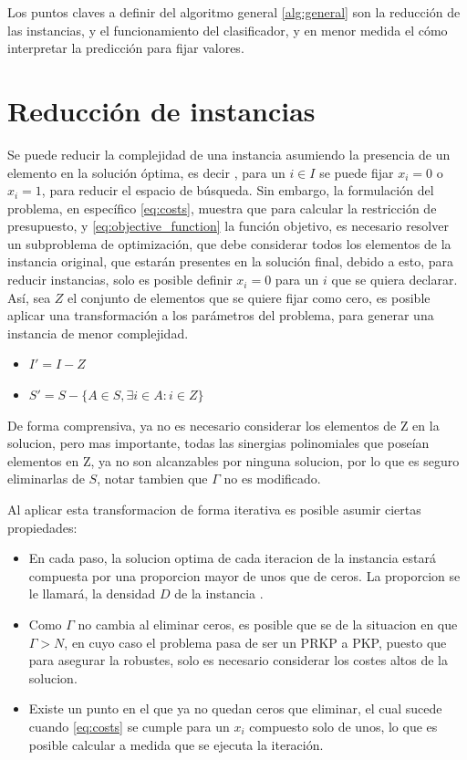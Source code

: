 \documentclass[spanish, a4paper, 12pt, twoside, openany,final]{book}
\numberwithin{equation}{section}
\begin{document}
Los puntos claves a definir del algoritmo general \ref{alg:general} son la reducción de las instancias, y el funcionamiento del clasificador, y en menor medida el cómo interpretar la predicción para fijar valores.





\section{Reducción de instancias}

Se puede reducir la complejidad de una instancia asumiendo la presencia de un elemento en la solución óptima, es decir , para un $i \in I$ se puede fijar $x_i=0$ o $x_i = 1$, para reducir el espacio de búsqueda. Sin embargo, la formulación del problema, en específico \ref{eq:costs}, muestra que para calcular la restricción de presupuesto, y \ref{eq:objective_function} la función objetivo, es necesario resolver un subproblema de optimización, que debe considerar todos los elementos de la instancia original, que estarán presentes en la solución final, debido a esto, para reducir instancias, solo es posible definir $x_i=0$ para un $i$ que se quiera declarar. Así, sea $Z$ el conjunto de elementos que se quiere fijar como cero, es posible aplicar una transformación a los parámetros del problema, para generar una instancia de menor complejidad.
	
\begin{itemize}
	\item $I' = I - Z$
	\item $S' = S - \{A \in S, \exists i \in A: i \in Z\} $
\end{itemize}

De forma comprensiva, ya no es necesario considerar los elementos de Z en la solucion, pero mas importante,
todas las sinergias polinomiales que poseían elementos en Z, ya no son alcanzables por ninguna solucion, por lo que es seguro eliminarlas de $S$, notar tambien que $\Gamma$ no es modificado.

Al aplicar esta transformacion de forma iterativa es posible asumir ciertas propiedades:


\begin{itemize}
\item En cada paso, la solucion optima de cada iteracion de la instancia estará compuesta por una proporcion mayor de unos que de ceros. La proporcion se le llamará, la densidad $D$ de la instancia .

\item  Como $\Gamma$ no cambia al eliminar ceros, es posible que se de la situacion en que $\Gamma > N$, en cuyo caso el problema pasa de ser un PRKP a PKP, puesto que para asegurar la robustes, solo es necesario considerar los costes altos de la solucion.

\item  Existe un punto en el que ya no quedan ceros que eliminar, el cual sucede cuando \ref{eq:costs} se cumple para un $x_i$ compuesto solo de unos, lo que es posible calcular a medida que se ejecuta la iteración.
\end{itemize}
\end{document}
